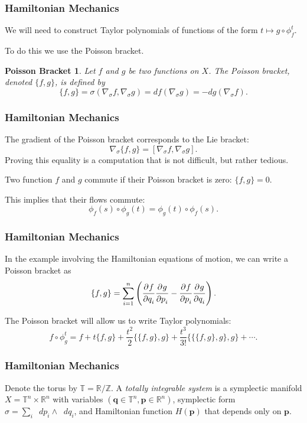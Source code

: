 \documentclass{beamer}
\newcommand{\Z}{\mathbb{Z}}
\newcommand{\R}{\mathbb{R}}
\newcommand{\bp}[1]{\bm{#1}}
\newcommand{\sgrad}{\nabla_{\sigma}}
\newcommand{\dif}{\mathop{}\!{d}}
\newcommand\pd[3][]{\frac{\strut\partial^{#1}#2}{\strut\partial#3^{#1}}}
\begin{document}
\begin{frame}
  \frametitle{Hamiltonian Mechanics}
  We will need to construct Taylor polynomials of functions of the form $t
  \mapsto g \circ \phi^t_f$.

  To do this we use the Poisson bracket.
  \newtheorem{possbrack}{Poisson Bracket}
  \begin{possbrack}
    Let $f$ and $g$ be two functions on $X$.
    The \emph{Poisson bracket}, denoted $\{f, g\}$, is defined by
    \begin{equation*}
      \{f, g\} = \sigma(\sgrad f, \sgrad g) = df(\sgrad g) = - dg(\sgrad f).
    \end{equation*}
  \end{possbrack}
\end{frame}

\begin{frame}
  \frametitle{Hamiltonian Mechanics}
  The gradient of the Poisson bracket corresponds to the Lie bracket:
  \begin{equation*}
    \sgrad \{f, g\} = [\sgrad f, \sgrad g].
  \end{equation*}
  Proving this equality is a computation that is not difficult, but rather
  tedious.

  Two function $f$ and $g$ commute if their Poisson bracket is zero: $\{f, g\} =
  0$.

  This implies that their flows commute:
  \begin{equation*}
    \phi_f(s) \circ \phi_g(t) = \phi_g(t) \circ \phi_f(s).
  \end{equation*}
\end{frame}

\begin{frame}
  \frametitle{Hamiltonian Mechanics}
  In the example involving the Hamiltonian equations of motion, we can write a
  Poisson bracket as
  \begin{equation*}
    \{f, g\} = \sum_{i = 1}^n \left( \pd{f}{q_i} \pd{g}{p_i} - \pd{f}{p_i}
      \pd{g}{q_i}\right).
  \end{equation*}

  The Poisson bracket will allow us to write Taylor polynomials:
  \begin{equation*}
    f \circ \phi^t_g = f + t \{f, g\} + \frac{t^2}{2} \{\{f,g\},g\} +
    \frac{t^3}{3!} \{\{\{f,g\},g\},g\} + \cdots.
  \end{equation*}
\end{frame}

\begin{frame}
  \frametitle{Hamiltonian Mechanics}
  Denote the torus by $\mathbb{T} = \R / \Z$.
  A \emph{totally integrable system} is a symplectic manifold $X = \mathbb{T}^n
  \times \R^n$ with variables $(\bp{q} \in \mathbb{T}^n, \bp{p} \in \R^n)$,
  symplectic form $\sigma = \sum_i \dif p_i \wedge \dif q_i$, and Hamiltonian
  function $H(\bp{p})$ that depends only on $\bp{p}$.
\end{frame}
\end{document}
